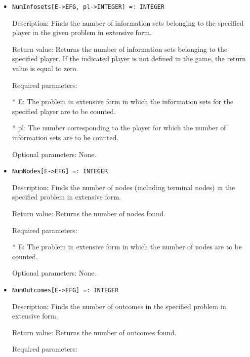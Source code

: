 \begin{itemize}
\item
\begin{verbatim}
NumInfosets[E->EFG, pl->INTEGER] =: INTEGER
\end{verbatim}

\bd
\item
[Description:] Finds the number of information sets belonging to the
specified player in the given problem in extensive form.
\item
[Return value:] Returns the number of information sets belonging to
the specified player.  If the indicated player is not defined in the 
game, the return value is equal to zero.
\item
[Required parameters:]\hfil\null

\bd
\item
[* E:] The problem in extensive form in which the information sets
for the specified player are to be counted.	  
\item
[* pl:] The number corresponding to the player for which the number 
of information sets are to be counted.
\ed
\item
 [Optional parameters:] None.
\ed

\item
\begin{verbatim}
NumNodes[E->EFG] =: INTEGER
\end{verbatim}

\bd
\item
[Description:] Finds the number of nodes (including terminal nodes) in 
the specified problem in extensive form.
\item
[Return value:] Returns the number of nodes found.
\item
[Required parameters:]\hfil\null

\bd
\item
[* E:] The problem in extensive form in which the number of nodes are
to be counted.
\ed

\item
[Optional parameters:] None.
\ed

\item
\begin{verbatim}
NumOutcomes[E->EFG] =: INTEGER
\end{verbatim}

\bd
\item
[Description:] Finds the number of outcomes in the specified problem in
extensive form.
\item
[Return value:] Returns the number of outcomes found.
\item
[Required parameters:]\hfil\null	  


\end{itemize}
